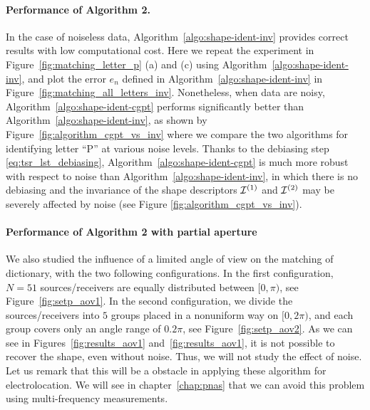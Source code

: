 \paragraph{Performance of Algorithm 2.}
In the case of noiseless data,
Algorithm~\ref{algo:shape-ident-inv} provides correct results with
low computational cost. Here we repeat the experiment in
Figure~\ref{fig:matching_letter_p} (a) and (c) using
Algorithm~\ref{algo:shape-ident-inv}, and plot the error $e_n$
defined in Algorithm~\ref{algo:shape-ident-inv} in
Figure~\ref{fig:matching_all_letters_inv}. Nonetheless, when data
are noisy, Algorithm~\ref{algo:shape-ident-cgpt} performs
significantly better than Algorithm~\ref{algo:shape-ident-inv}, as
shown by Figure~\ref{fig:algorithm_cgpt_vs_inv} where we compare
the two algorithms for identifying letter ``P'' at various noise
levels. Thanks to the debiasing step \eqref{eq:tsr_lst_debiasing},
Algorithm~\ref{algo:shape-ident-cgpt} is much more robust with
respect to noise than Algorithm~\ref{algo:shape-ident-inv}, in
which there is no debiasing and the invariance of the shape
descriptors $\mathcal{I}^{(1)}$ and $\mathcal{I}^{(2)}$ may be severely affected by
noise (see Figure \ref{fig:algorithm_cgpt_vs_inv}).

\paragraph{Performance of Algorithm 2 with partial aperture}

We also studied the influence of a limited angle of view on the
matching of dictionary, with the two following configurations.
In the first
configuration, $N=51$ sources/receivers are equally distributed
between $[0,\pi)$, see Figure~\ref{fig:setp_aov1}.
In the second configuration, we
divide the sources/receivers into $5$ groups placed in a nonuniform
way on $[0, 2\pi)$, and each group covers only an angle range of
$0.2\pi$, see Figure~\ref{fig:setp_aov2}.
As we can see in Figures~\ref{fig:results_aov1} and~\ref{fig:results_aov1},
it is not possible to recover the shape, even without noise. Thus, we will
not study the effect of noise. Let us remark that this will be a obstacle in
applying these algorithm for electrolocation. We will see in
chapter~\ref{chap:pnas} that we can avoid this problem using multi-frequency
measurements. 

